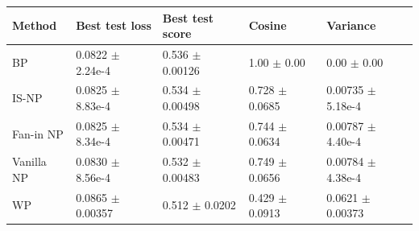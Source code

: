 \begin{tabular}{lllll}
\toprule
Method & Best test loss & Best test score & Cosine & Variance \\
\midrule
BP & 0.0822 $\pm$ 2.24e-4 & 0.536 $\pm$ 0.00126 & 1.00 $\pm$ 0.00 & 0.00 $\pm$ 0.00 \\
IS-NP & 0.0825 $\pm$ 8.83e-4 & 0.534 $\pm$ 0.00498 & 0.728 $\pm$ 0.0685 & 0.00735 $\pm$ 5.18e-4 \\
Fan-in NP & 0.0825 $\pm$ 8.34e-4 & 0.534 $\pm$ 0.00471 & 0.744 $\pm$ 0.0634 & 0.00787 $\pm$ 4.40e-4 \\
Vanilla NP & 0.0830 $\pm$ 8.56e-4 & 0.532 $\pm$ 0.00483 & 0.749 $\pm$ 0.0656 & 0.00784 $\pm$ 4.38e-4 \\
WP & 0.0865 $\pm$ 0.00357 & 0.512 $\pm$ 0.0202 & 0.429 $\pm$ 0.0913 & 0.0621 $\pm$ 0.00373 \\
\bottomrule
\end{tabular}
